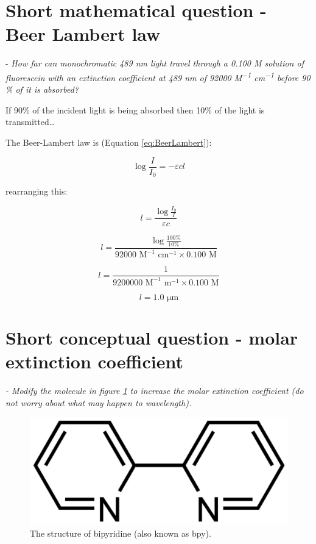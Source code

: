\documentclass[
]{book}
\begin{document}
\hypertarget{sec:BeerLambert}{%
\section{Short mathematical question - Beer Lambert law}\label{sec:BeerLambert}}

- \emph{How far can monochromatic 489 nm light travel through a 0.100 M solution of fluorescein with an extinction coefficient at 489 nm of 92000 M\textsuperscript{−1} cm\textsuperscript{−1} before 90 \% of it is absorbed?}

If 90\% of the incident light is being absorbed then 10\% of the light is transmitted\ldots{}

The Beer-Lambert law is (Equation \eqref{eq:BeerLambert}):

\begin{equation}
\log{\frac{I}{I_0}}=-\varepsilon c l
\label{eq:BeerLambert}
\end{equation}

rearranging this:

\begin{equation*}
l = \frac{\log{\frac{I_0}{I}}}{\varepsilon c}
\end{equation*}

\begin{equation*}
l = \frac{\log{\frac{100 \%}{10 \%}}}{92000 \textrm{ M}^{-1} \textrm{ cm}^{-1} \times 0.100 \textrm{ M}}
\end{equation*}

\begin{equation*}
l = \frac{1}{9200000 \textrm{ M}^{-1} \textrm{ m}^{-1} \times 0.100 \textrm{ M}}
\end{equation*}

\begin{equation*}
l = 1.0 \textrm{ μm}
\end{equation*}

\hypertarget{sec:MolarExtinction}{%
\section{Short conceptual question - molar extinction coefficient}\label{sec:MolarExtinction}}

\emph{- Modify the molecule in figure \ref{fig:bpy} to increase the molar extinction coefficient (do not worry about what may happen to wavelength).}

\begin{figure}

{\centering \includegraphics[width=0.3\linewidth]{images/bpy} 

}

\caption{The structure of bipyridine (also known as bpy).}\label{fig:bpy}
\end{figure}
\end{document}
